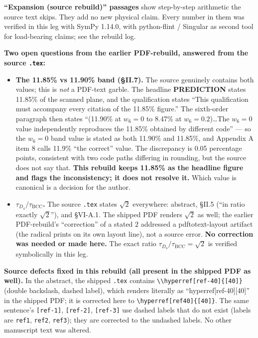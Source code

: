 \documentclass[a4paper,11pt]{article}
\begin{document}
\textbf{``Expansion (source rebuild)'' passages} show step-by-step arithmetic the source text skips. They add no new physical claim. Every number in them was verified in this leg with SymPy 1.14.0, with python-flint / Singular as second tool for load-bearing claims; see the rebuild log.

\textbf{Two open questions from the earlier PDF-rebuild, answered from the source \texttt{.tex}:}

\begin{itemize}
\item \textbf{The 11.85\% vs 11.90\% band (\S II.7).} The source genuinely contains both values; this is \textit{not} a PDF-text garble. The headline \textbf{PREDICTION} states 11.85\% of the scanned plane, and the qualification states ``This qualification must accompany every citation of the 11.85\% figure.'' The sixth-order paragraph then states ``(11.90\% at $w_6=0$ to 8.47\% at $w_6=0.2$)\ldots The $w_6=0$ value independently reproduces the 11.85\% obtained by different code'' --- so the $w_6=0$ band value is stated as both 11.90\% and 11.85\%, and Appendix A item 8 calls 11.9\% ``the correct'' value. The discrepancy is 0.05 percentage points, consistent with two code paths differing in rounding, but the source does not say that. \textbf{This rebuild keeps 11.85\% as the headline figure and flags the inconsistency; it does not resolve it.} Which value is canonical is a decision for the author.
\item \textbf{$\tau_{D_4}/\tau_{\mathrm{BCC}}$.} The source \texttt{.tex} states $\sqrt{2}$ everywhere: abstract, \S II.5 (``in ratio exactly $\sqrt2$''), and \S VI-A.1. The shipped PDF renders $\sqrt{2}$ as well; the earlier PDF-rebuild's ``correction'' of a stated $2$ addressed a pdftotext-layout artifact (the radical prints on its own layout line), not a source error. \textbf{No correction was needed or made here.} The exact ratio $\tau_{D_4}/\tau_{\mathrm{BCC}}=\sqrt{2}$ is verified symbolically in this leg.
\end{itemize}

\textbf{Source defects fixed in this rebuild (all present in the shipped PDF as well).} In the abstract, the shipped \texttt{.tex} contains \texttt{\textbackslash\textbackslash hyperref[ref-40]\{[40]\}} (double backslash, dashed label), which renders literally as ``hyperref[ref-40][40]'' in the shipped PDF; it is corrected here to \texttt{\textbackslash hyperref[ref40]\{[40]\}}. The same sentence's \texttt{[ref-1]}, \texttt{[ref-2]}, \texttt{[ref-3]} use dashed labels that do not exist (labels are \texttt{ref1}, \texttt{ref2}, \texttt{ref3}); they are corrected to the undashed labels. No other manuscript text was altered.
\end{document}
